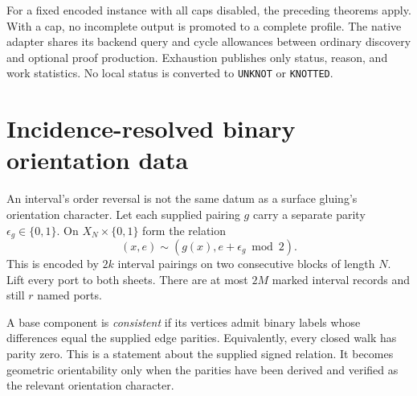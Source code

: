 \documentclass[11pt]{article}
\theoremstyle{definition}
\begin{document}
For a fixed encoded instance with all caps disabled, the preceding theorems
apply. With a cap, no incomplete output is promoted to a complete profile.
The native adapter shares its backend query and cycle allowances between
ordinary discovery and optional proof production. Exhaustion publishes only
status, reason, and work statistics. No local status is converted to
\texttt{UNKNOT} or \texttt{KNOTTED}.

\section{Incidence-resolved binary orientation data}
\label{sec:orientation}
An interval's order reversal is not the same datum as a surface gluing's
orientation character. Let each supplied pairing $g$ carry a separate
parity $\epsilon_g\in\{0,1\}$. On $X_N\times\{0,1\}$ form the relation
\begin{equation}
 (x,e)\sim(g(x),e+\epsilon_g\bmod2).
 \label{eq:cover}
\end{equation}
This is encoded by $2k$ interval pairings on two consecutive blocks of
length $N$. Lift every port to both sheets. There are at most $2M$ marked
interval records and still $r$ named ports.

A base component is \emph{consistent} if its vertices admit binary labels
whose differences equal the supplied edge parities. Equivalently, every
closed walk has parity zero. This is a statement about the supplied signed
relation. It becomes geometric orientability only when the parities have
been derived and verified as the relevant orientation character.
\end{document}
